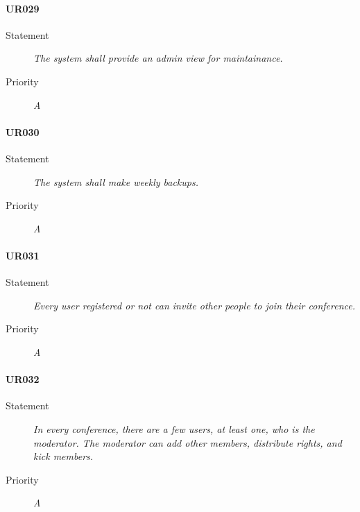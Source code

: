 \paragraph{UR029}
\begin{description}
\item[Statement] \textit{The system shall provide an admin view for
    maintainance.}
\item[Priority] \textit{A}
\end{description}


\paragraph{UR030}
\begin{description}
\item[Statement] \textit{The system shall make weekly backups.}
\item[Priority] \textit{A}
\end{description}

\paragraph{UR031}
\begin{description}
\item[Statement] \textit{Every user registered or not can invite other people
    to join their conference.}
\item[Priority] \textit{A}
\end{description}

\paragraph{UR032}
\begin{description}
\item[Statement] \textit{In every conference, there are a few users, at least
    one, who is the moderator. The moderator can add other members, distribute
    rights, and kick members.}
\item[Priority] \textit{A}
\end{description}


